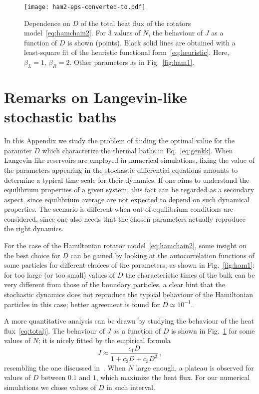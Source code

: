 \documentclass[iop, twocolumns, amssymb,notitlepage]{revtex4-1}
\begin{document}
 \begin{figure}
 \centering
\texttt{[image: ham2-eps-converted-to.pdf]}
\caption{\label{fig:ham2}Dependence on $D$ of the total heat flux  of the rotators  model~\eqref{eq:hamchain2}. For 3 values of $N$,
the behaviour of $J$ as a function of $D$ is shown (points). Black solid lines are obtained with a least-square
fit of the heuristic functional form~\eqref{eq:heuristic}. Here, $\beta_L=1$, $\beta_R=2$. Other parameters as in Fig.~\ref{fig:ham1}.}
 \end{figure}

\section{Remarks on Langevin-like stochastic baths}
\label{sec:appendixstoch} 

In this Appendix we study the problem of finding the optimal value for the 
paramter $D$ which characterize the thermal baths in Eq.~\eqref{eq:genkk}. When 
Langevin-like reservoirs are employed in numerical simulations, fixing the value 
of the parameters appearing in the stochastic differential equations amounts to 
determine a typical time scale for their dynamics. If one aims to understand
the equilibrium properties of a given system, this fact can be regarded as a 
secondary aspect, since equilibrium average are not expected to depend on such 
dynamical properties. The scenario is different when out-of-equilibrium 
conditions are considered, since one also needs that the chosen parameters
actually reproduce the right dynamics. 

 For the case of the Hamiltonian rotator model~\eqref{eq:hamchain2}, some insight on the best choice for $D$ can be gained by looking at 
the autocorrelation functions of some particles for different choices of the 
parameters, as shown in Fig.~\ref{fig:ham1}: for too large (or too small) values 
of $D$ the characteristic times of the bulk can be very different from those of 
the boundary particles, a clear hint that the stochastic dynamics does not 
reproduce the typical behaviour of the Hamiltonian particles in this case; 
better agreement is found for $D \simeq 10^{-1}$.

A more quantitative analysis 
can be drawn by studying the behaviour of the heat flux~\eqref{eq:totalj}. The 
behaviour of $J$ as a function of $D$ is shown in Fig.~\ref{fig:ham2} for some 
values of $N$; it is nicely fitted by the empirical formula
\begin{equation}
\label{eq:heuristic}
 J \approx \frac{c_1 D}{1+c_2D+c_3D^2}\,,
\end{equation} 
resembling the one discussed in~\cite{lepri03}. When $N$ large enough, a plateau 
is observed for values of $D$ between $0.1$ and $1$, which maximize the heat flux.
For our numerical simulations we chose values of $D$ in such interval. 
\end{document}
